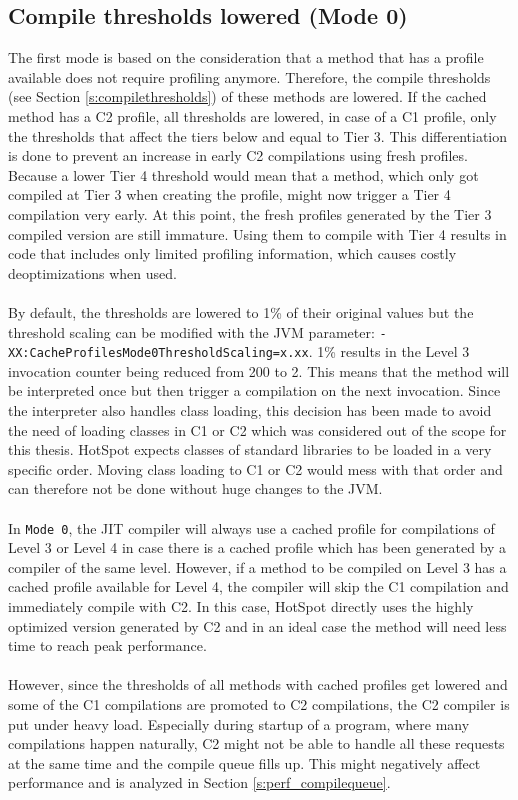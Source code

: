 \subsection{Compile thresholds lowered (Mode 0)}
\label{s:mode0}
The first mode is based on the consideration that a method that has a profile available does not require profiling anymore. Therefore, the compile thresholds (see Section \ref{s:compilethresholds}) of these methods are lowered. If the cached method has a C2 profile, all thresholds are lowered, in case of a C1 profile, only the thresholds that affect the tiers below and equal to Tier 3. This differentiation is done to prevent an increase in early C2 compilations using fresh profiles. Because a lower Tier 4 threshold would mean that a method, which only got compiled at Tier 3 when creating the profile, might now trigger a Tier 4 compilation very early. At this point, the fresh profiles generated by the Tier 3 compiled version are still immature. Using them to compile with Tier 4 results in code that includes only limited profiling information, which causes costly deoptimizations when used. 
\\\\
By default, the thresholds are lowered to 1\% of their original values but the threshold scaling can be modified with the JVM parameter: \texttt{-XX:CacheProfilesMode0ThresholdScaling=x.xx}. 1\% results in the Level 3 invocation counter being reduced from 200 to 2. This means that the method will be interpreted once but then trigger a compilation on the next invocation.
Since the interpreter also handles class loading, this decision has been made to avoid the need of loading classes in C1 or C2 which was considered out of the scope for this thesis. HotSpot expects classes of standard libraries to be loaded in a very specific order. Moving class loading to C1 or C2 would mess with that order and can therefore not be done without huge changes to the JVM.
\\\\
In \texttt{Mode 0}, the JIT compiler will always use a cached profile for compilations of Level 3 or Level 4 in case there is a cached profile which has been generated by a compiler of the same level. However, if a method to be compiled on Level 3 has a cached profile available for Level 4, the compiler will skip the C1 compilation and immediately compile with C2. In this case, HotSpot directly uses the highly optimized version generated by C2 and in an ideal case the method will need less time to reach peak performance.
\\\\
However, since the thresholds of all methods with cached profiles get lowered and some of the C1 compilations are promoted to C2 compilations, the C2 compiler is put under heavy load. Especially during startup of a program, where many compilations happen naturally, C2 might not be able to handle all these requests at the same time and the compile queue fills up. This might negatively affect performance and is analyzed in Section \ref{s:perf_compilequeue}.

